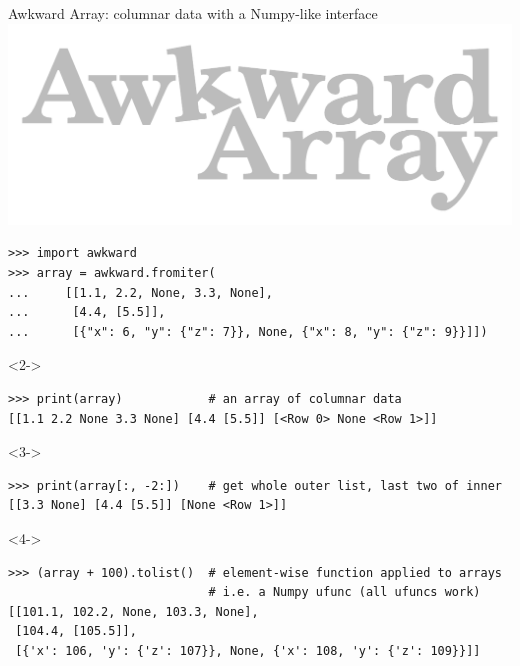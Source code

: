 \documentclass[aspectratio=169]{beamer}
\begin{document}
\begin{frame}[fragile]{Awkward Array: columnar data with a Numpy-like interface}
\vspace{0.35 cm}
\small
\hfill\includegraphics[height=2 cm]{awkward-logo.pdf}

\vspace{-2 cm}
\begin{verbatim}
>>> import awkward
>>> array = awkward.fromiter(
...     [[1.1, 2.2, None, 3.3, None],
...      [4.4, [5.5]],
...      [{"x": 6, "y": {"z": 7}}, None, {"x": 8, "y": {"z": 9}}]])
\end{verbatim}

\begin{uncoverenv}<2->
\begin{verbatim}
>>> print(array)            # an array of columnar data
[[1.1 2.2 None 3.3 None] [4.4 [5.5]] [<Row 0> None <Row 1>]]
\end{verbatim}
\end{uncoverenv}

\begin{uncoverenv}<3->
\begin{verbatim}
>>> print(array[:, -2:])    # get whole outer list, last two of inner
[[3.3 None] [4.4 [5.5]] [None <Row 1>]]
\end{verbatim}
\end{uncoverenv}

\begin{uncoverenv}<4->
\begin{verbatim}
>>> (array + 100).tolist()  # element-wise function applied to arrays
                            # i.e. a Numpy ufunc (all ufuncs work)
[[101.1, 102.2, None, 103.3, None],
 [104.4, [105.5]],
 [{'x': 106, 'y': {'z': 107}}, None, {'x': 108, 'y': {'z': 109}}]]
\end{verbatim}
\end{uncoverenv}
\end{frame}
\end{document}
